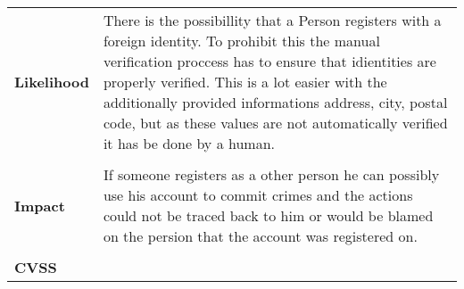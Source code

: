 \begin{longtable*}{p{.20\textwidth} | p{.80\textwidth}}
    \textbf{Likelihood} &
        There is the possibillity that a Person registers with a foreign identity. To prohibit this the manual verification proccess has to ensure that idientities are properly verified. This is a lot easier with the additionally provided informations address, city, postal code, but as these values are not automatically verified it has be done by a human.
    \\\\
    \textbf{Impact} &
        If someone registers as a other person he can possibly use his account to commit crimes and the actions could not be traced back to him or would be blamed on the persion that the account was registered on.
    \\\\
    \textbf{CVSS} &
        
    \\
    \hline
\end{longtable*}
\clearpage